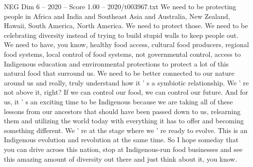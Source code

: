 \begin{textsample}{NEG Dim 6 – 2020 – Score 1.00 – 2020/t003967.txt}
We need to be protecting people in Africa and India and Southeast Asia and Australia, New Zealand, Hawaii, South America, North America.
We need to protect those.
We need to be celebrating diversity instead of trying to build stupid walls to keep people out.
We need to have, you know, healthy food access, cultural food producers, regional food systems, local control of food systems, not governmental control, access to Indigenous education and environmental protections to protect a lot of this natural food that surround us.
We need to be better connected to our nature around us and really, truly understand how it ' s a symbiotic relationship.
We ' re not above it, right?
If we can control our food, we can control our future.
And for us, it ' s an exciting time to be Indigenous because we are taking all of these lessons from our ancestors that should have been passed down to us, relearning them and utilizing the world today with everything it has to offer and becoming something different.
We ' re at the stage where we ' re ready to evolve.
This is an Indigenous evolution and revolution at the same time.
So I hope someday that you can drive across this nation, stop at Indigenous-run food businesses and see this amazing amount of diversity out there and just think about it, you know.

\end{textsample}
